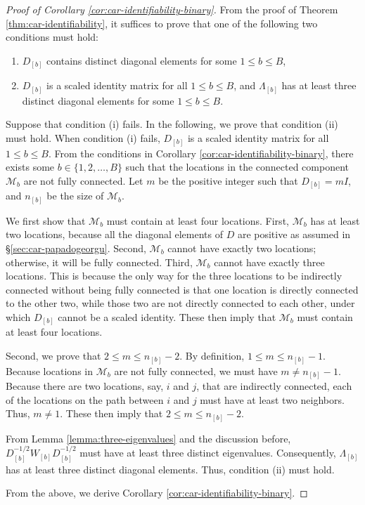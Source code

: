 \documentclass[11pt]{article}
\theoremstyle{definition}
\theoremstyle{remark}
\begin{document}
\begin{proof}[Proof of Corollary \ref{cor:car-identifiability-binary}]
From the proof of Theorem \ref{thm:car-identifiability},
it suffices to prove that one of the following two conditions must hold: 
\begin{enumerate}[label=(\roman*)]
    \item $D_{[b]}$ contains distinct diagonal elements for some $1\le b \le B$, 
    \item $D_{[b]}$ is a scaled identity matrix for all $1\le b \le B$, 
    and 
    $\Lambda_{[b]}$ has at least three distinct diagonal elements for some $1\le b \le B$.
\end{enumerate} 

Suppose that condition (i) fails. In the following, we prove that condition (ii) must hold. When condition (i) fails, $D_{[b]}$ is a scaled identity matrix for all $1\le b \le B$.
From the conditions in Corollary \ref{cor:car-identifiability-binary}, 
there exists some $b\in \{1,2,\ldots,B\}$ such that the locations in the connected component $\mathcal{M}_b$ are not fully connected. 
Let $m$ be the positive integer such that $D_{[b]} = m I$, and $n_{[b]}$ be the size of $\mathcal{M}_b$. 


We first show that 
$\mathcal{M}_b$ must contain at least four locations. 
First, $\mathcal{M}_b$ has at least two locations, because all the diagonal elements of $D$ are positive as assumed in \S \ref{sec:car-papadogeorgu}. 
Second, $\mathcal{M}_b$ cannot have exactly two locations; otherwise, it will be fully connected. 
Third, $\mathcal{M}_b$ cannot have exactly three locations. 
This is because the only way for the three locations to be indirectly connected without being fully connected is that one location is directly connected to the other two, while those two are not directly connected to each other, under which $D_{[b]}$ cannot be a scaled identity. 
These then imply that $\mathcal{M}_b$ must contain at least four locations. 

Second, we prove that $2 \le  m \le n_{[b]}-2$. 
By definition, $1\le m \le n_{[b]}-1$. 
Because locations in $\mathcal{M}_b$ are not fully connected, we must have $m \ne n_{[b]}-1$. 
Because there are two locations, say, $i$ and $j$, that are indirectly connected, each of the locations on the path between $i$ and $j$ must have at least two neighbors. Thus, $m\ne 1$. 
These then imply that $2 \le  m \le n_{[b]}-2$. 


From Lemma \ref{lemma:three-eigenvalues} and the discussion before, 
$D_{[b]}^{-1/2} W_{[b]} D_{[b]}^{-1/2}$ must have at least three distinct eigenvalues. Consequently, $\Lambda_{[b]}$ has at least three distinct diagonal elements. Thus, condition (ii) must hold. 

From the above, we derive Corollary \ref{cor:car-identifiability-binary}. 
\end{proof}
\end{document}
